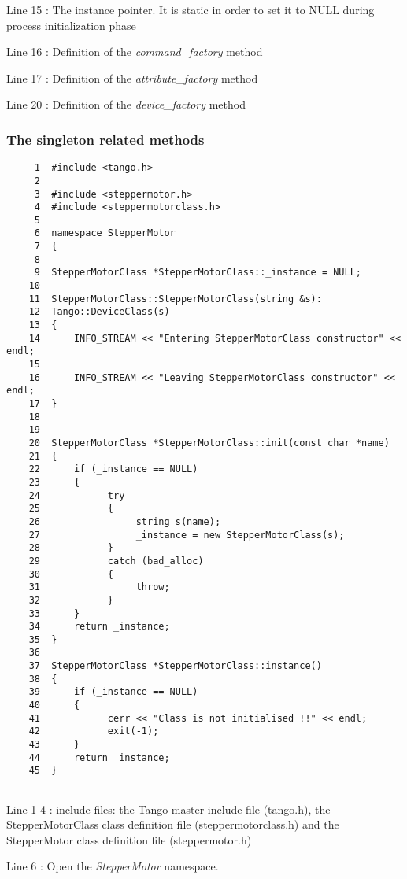 Line 15 : The instance pointer. It is static in order to set it to
NULL during process initialization phase

Line 16 : Definition of the \emph{command\_factory}
method

Line 17 : Definition of the \emph{attribute\_factory}
method

Line 20 : Definition of the \emph{device\_factory}
method


\subsubsection{The singleton related methods}



 
\begin{verbatim}
     1  #include <tango.h>
     2  
     3  #include <steppermotor.h>
     4  #include <steppermotorclass.h>
     5  
     6  namespace StepperMotor
     7  {
     8  
     9  StepperMotorClass *StepperMotorClass::_instance = NULL;
    10  
    11  StepperMotorClass::StepperMotorClass(string &s):
    12  Tango::DeviceClass(s)
    13  {
    14      INFO_STREAM << "Entering StepperMotorClass constructor" << endl;
    15          
    16      INFO_STREAM << "Leaving StepperMotorClass constructor" << endl;
    17  }
    18  
    19  
    20  StepperMotorClass *StepperMotorClass::init(const char *name)
    21  {
    22      if (_instance == NULL)
    23      {
    24            try
    25            {
    26                 string s(name);
    27                 _instance = new StepperMotorClass(s);
    28            }
    29            catch (bad_alloc)
    30            {
    31                 throw;
    32            }               
    33      }               
    34      return _instance;
    35  }
    36  
    37  StepperMotorClass *StepperMotorClass::instance()
    38  {
    39      if (_instance == NULL)
    40      {
    41            cerr << "Class is not initialised !!" << endl;
    42            exit(-1);
    43      }
    44      return _instance;
    45  }
 
\end{verbatim}


Line 1-4 : include files: the Tango master include file (tango.h),
the StepperMotorClass class definition file (steppermotorclass.h)
and the StepperMotor class definition file (steppermotor.h)

Line 6 : Open the \emph{StepperMotor} namespace.

